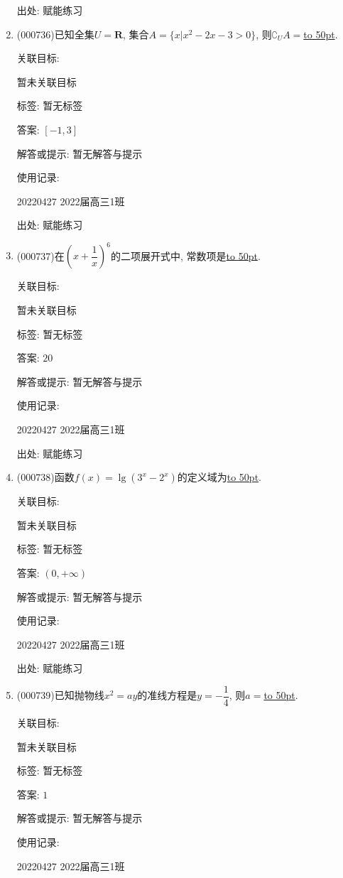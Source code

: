 \documentclass[10pt,a4paper]{article}
\newcommand{\blank}[1]{\underline{\hbox to #1pt{}}}
\begin{document}
\begin{enumerate}[1.]
出处: 赋能练习
\item { (000736)}已知全集$U=\mathbf{R}$, 集合$A=\{x|x^2-2x-3>0\}$, 则$\complement_U A=$\blank{50}.


关联目标:

暂未关联目标



标签: 暂无标签

答案: $[-1,3]$

解答或提示: 暂无解答与提示

使用记录:

20220427	2022届高三1班	


出处: 赋能练习
\item { (000737)}在$(x+\dfrac1x)^6$的二项展开式中, 常数项是\blank{50}.


关联目标:

暂未关联目标



标签: 暂无标签

答案: $20$

解答或提示: 暂无解答与提示

使用记录:

20220427	2022届高三1班	


出处: 赋能练习
\item { (000738)}函数$f(x)=\lg (3^x-2^x)$的定义域为\blank{50}.


关联目标:

暂未关联目标



标签: 暂无标签

答案: $(0,+\infty)$

解答或提示: 暂无解答与提示

使用记录:

20220427	2022届高三1班	


出处: 赋能练习
\item { (000739)}已知抛物线$x^2=ay$的准线方程是$y=-\dfrac14$, 则$a=$\blank{50}.


关联目标:

暂未关联目标



标签: 暂无标签

答案: $1$

解答或提示: 暂无解答与提示

使用记录:

20220427	2022届高三1班	



\end{enumerate}
\end{document}
